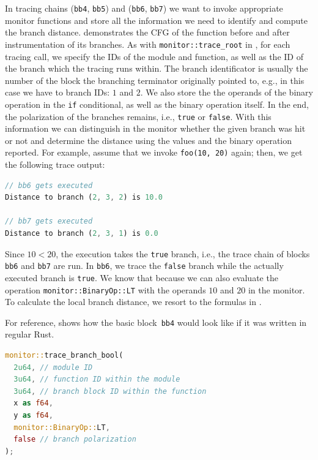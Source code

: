\documentclass[paper=a4,%
  twoside,%
  BCOR4mm,%
  abstract=true,%
  toc=bibliography,%
  chapterprefix=true,%
  toc=bibliographynumbered,%
  open=right,%
  english,%
  pagesize=pdftex]{scrreprt}
\newcommand{\cfg}{\ac{CFG}\xspace}
\begin{document}
In tracing chains (\texttt{bb4}, \texttt{bb5}) and (\texttt{bb6}, \texttt{bb7}) we want to invoke appropriate monitor functions and store all the information we need to identify and compute the branch distance.  demonstrates the \cfg of the function before and after instrumentation of its branches. As with \texttt{monitor::trace\string_root} in , for each tracing call, we specify the IDs of the module and function, as well as the ID of the branch which the tracing runs within. The branch identificator is usually the number of the block the branching terminator originally pointed to, e.g., in this case we have to branch IDs: $1$ and $2$. We also store the the operands of the binary operation in the \texttt{if} conditional, as well as the binary operation itself. In the end, the polarization of the branches remains, i.e., \texttt{true} or \texttt{false}. With this information we can distinguish in the monitor whether the given branch was hit or not and determine the distance using the values and the binary operation reported. For example, assume that we invoke \texttt{foo(10, 20)} again; then, we get the following trace output:

\begin{lstlisting}[language={Rust}, style=boxed, caption={}, label=lst:mir-instrument-branch-trace-output]
// bb6 gets executed
Distance to branch (2, 3, 2) is 10.0

// bb7 gets executed
Distance to branch (2, 3, 1) is 0.0
\end{lstlisting}

Since $10 < 20$, the execution takes the \texttt{true} branch, i.e., the trace chain of blocks \texttt{bb6} and \texttt{bb7} are run. In \texttt{bb6}, we trace the \texttt{false} branch while the actually executed branch is \texttt{true}. We know that because we can also evaluate the operation \texttt{monitor::BinaryOp::LT} with the operands $10$ and $20$ in the monitor. To calculate the local branch distance, we resort to the formulas in .

For reference,  shows how the basic block~\texttt{bb4} would look like if it was written in regular Rust.

\begin{lstlisting}[language={Rust}, style=boxed, caption={How would \texttt{bb4} look like in regular Rust code}, label=lst:basic-block-in-regular-rust]
monitor::trace_branch_bool(
  2u64, // module ID
  3u64, // function ID within the module
  3u64, // branch block ID within the function
  x as f64,
  y as f64,
  monitor::BinaryOp::LT,
  false // branch polarization
);
\end{lstlisting}
\end{document}
